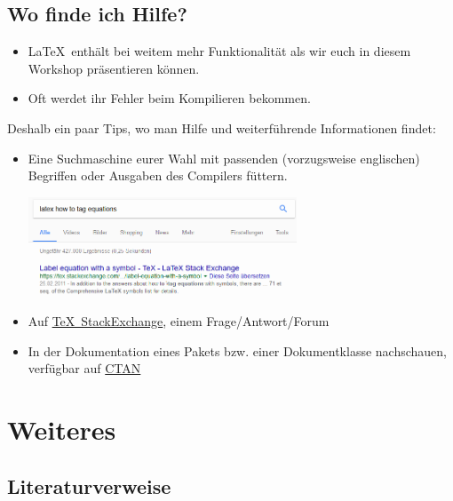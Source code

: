 \documentclass[german,10pt]{f1rstlady/templates/presentation}
\begin{document}
\subsection{Wo finde ich Hilfe?}

\begin{frame}{\subsecname}
\begin{itemize}
    \item \LaTeX\ enthält bei weitem mehr Funktionalität als wir euch in diesem Workshop präsentieren
        können.
    \item Oft werdet ihr Fehler beim Kompilieren bekommen.
\end{itemize}
Deshalb ein paar Tips, wo man Hilfe und weiterführende Informationen findet:
\begin{itemize}
    \item Eine \alert{Suchmaschine} eurer Wahl mit passenden (vorzugsweise englischen) Begriffen
        oder Ausgaben des Compilers füttern.
        \begin{center}
            \includegraphics[keepaspectratio,width=8cm]{images/google.png}
        \end{center}
    \item Auf \href{https://tex.stackexchange.com}{\alert{\TeX~StackExchange}}, einem
        Frage\-/Antwort\-/Forum
    \item In der \alert{Dokumentation} eines Pakets bzw. einer Dokumentklasse nachschauen, verfügbar
        auf \href{https://ctan.org}{CTAN}
\end{itemize}
\end{frame}

\section{Weiteres}

\subsection{Literaturverweise}
\end{document}
